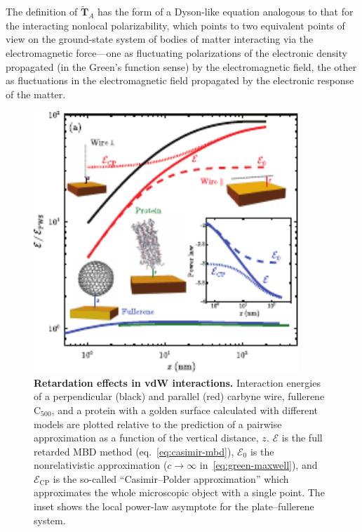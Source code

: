 The definition of $\tilde{\mathbf T}_A$ has the form of a Dyson-like equation analogous to that for the interacting nonlocal polarizability, which points to two equivalent points of view on the ground-state system of bodies of matter interacting via the electromagnetic force---one as fluctuating polarizations of the electronic density propagated (in the Green's function sense) by the electromagnetic field, the other as fluctuations in the electromagnetic field propagated by the electronic response of the matter.

\begin{figure}[t]
\centering
\includegraphics[width=10cm]{media/casimir.pdf}
\caption{\textbf{Retardation effects in vdW interactions.}
Interaction energies of a perpendicular (black) and parallel (red) carbyne wire, fullerene C$_{500}$, and a protein with a golden surface calculated with different models are plotted relative to the prediction of a pairwise approximation as a function of the vertical distance, $z$.
$\mathcal{E}$ is the full retarded MBD method (eq.~\ref{eq:casimir-mbd}), $\mathcal{E}_0$ is the nonrelativistic approximation ($c\rightarrow\infty$ in~\eqref{eq:green-maxwell}), and $\mathcal E_\text{CP}$ is the so-called ``Casimir--Polder approximation'' which approximates the whole microscopic object with a single point.
The inset shows the local power-law asymptote for the plate--fullerene system.
}\label{fig:casimir}
\end{figure}

